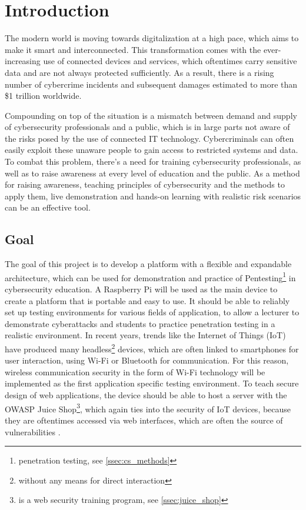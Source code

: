 \chapter{Introduction}\label{ch:intro}
The modern world is moving towards digitalization at a high pace, which aims to make it smart and interconnected. 
This transformation comes with the ever-increasing use of connected devices and services, which oftentimes carry sensitive data and are not always protected sufficiently.
As a result, there is a rising number of cybercrime incidents and subsequent damages estimated to more than \$1 trillion worldwide.

Compounding on top of the situation is a mismatch between demand and supply of cybersecurity professionals and a public, which is in large parts not aware of the risks posed by the use of connected IT technology.
Cybercriminals can often easily exploit these unaware people to gain access to restricted systems and data.
To combat this problem, there's a need for training cybersecurity professionals, as well as to raise awareness at every level of education and the public.
As a method for raising awareness, teaching principles of cybersecurity and the methods to apply them, live demonstration and hands-on learning with realistic risk scenarios can be an effective tool. \cite{mariano2024wifi}\cite{Cybersec_Edu}


\section{Goal}
The goal of this project is to develop a platform with a flexible and expandable architecture, which can be used for demonstration and practice of Pentesting\footnote{penetration testing, see \cref{ssec:cs_methods}} in cybersecurity education.
A Raspberry Pi will be used as the main device to create a platform that is portable and easy to use.
It should be able to reliably set up testing environments for various fields of application, to allow a lecturer to demonstrate cyberattacks and students to practice penetration testing in a realistic environment.
In recent years, trends like the Internet of Things (IoT) have produced many headless\footnote{without any means for direct interaction} devices, which are often linked to smartphones for user interaction, using Wi-Fi or Bluetooth for communication.
For this reason, wireless communication security in the form of Wi-Fi technology will be implemented as the first application specific testing environment.
To teach secure design of web applications, the device should be able to host a server with the OWASP Juice Shop\footnote{is a web security training program, see \cref{ssec:juice_shop}}, which again ties into the security of IoT devices, because they are oftentimes accessed via web interfaces, which are often the source of vulnerabilities \cite[page~174]{Hellmann_2023}.

